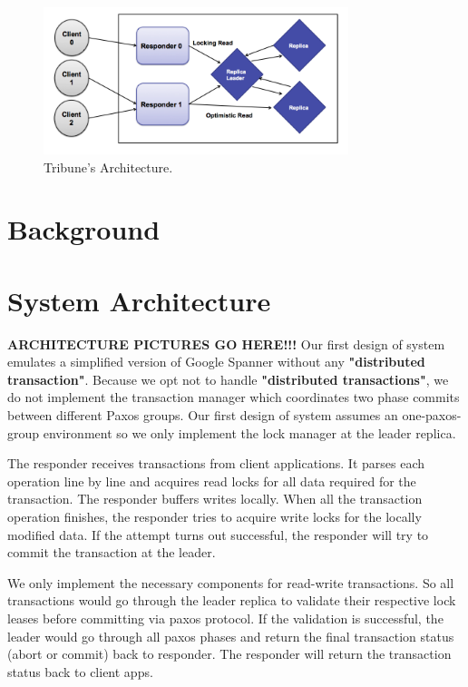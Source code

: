 \documentclass[10pt,twocolumn]{article}
\begin{document}
\begin{figure}[!b]
  \begin{center}
    \includegraphics[width=3.5in]{Images/Tribune_Arch.png}
  \end{center}

  \caption{\small Tribune's Architecture. }
  \label{Tribune_Arch}
\end{figure}

\section{Background}


\section{System Architecture}
 \textbf{ARCHITECTURE PICTURES GO HERE!!!}
Our first design of system emulates a simplified version of Google Spanner without any \textbf{ "distributed transaction"}. Because we opt not to handle \textbf{"distributed transactions"}, we do not implement the transaction manager which coordinates two phase commits between different Paxos groups. Our first design of system assumes an one-paxos-group environment so we only implement the lock manager at the leader replica.

The responder receives transactions from client applications. It parses each operation line by line and acquires read locks for all data required for the transaction. The responder buffers writes locally. When all the transaction operation finishes, the responder tries to acquire write locks for the locally modified data. If the attempt turns out successful, the responder will try to commit the transaction at the leader. 

We only implement the necessary components for read-write transactions. So all transactions would go through the leader replica to validate their respective lock leases before committing via paxos protocol. If the validation is successful, the leader would go through all paxos phases and return the final transaction status (abort or commit) back to responder. The responder will return the transaction status back to client apps.
\end{document}
